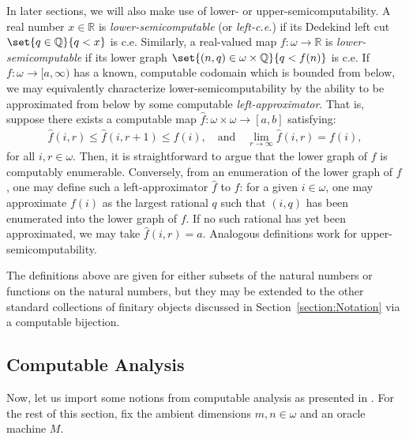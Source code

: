 In later sections, we will also make use of lower- or upper-semicomputability. A real number $x \in \mathbb{R}$ is \textit{lower-semicomputable} (or \textit{left-c.e.}) if its Dedekind left cut $\set{q \in \mathbb{Q}}{q < x}$ is c.e. Similarly, a real-valued map $f: \omega \to \mathbb{R}$ is \textit{lower-semicomputable} if its lower graph $\set{(n, q) \in \omega \times \mathbb{Q}}{q < f(n)}$ is c.e. If $f : \omega \to [a, \infty)$ has a known, computable codomain which is bounded from below, we may equivalently characterize lower-semicomputability by the ability to be approximated from below by some computable \textit{left-approximator}. That is, suppose there exists a computable map $\widehat{f} : \omega \times \omega \to [a, b]$ satisfying:
\begin{align*}
    \widehat{f}(i, r) \leq \widehat{f}(i, r + 1) \leq f(i), \quad \text{and} \quad \lim_{r \to \infty} \widehat{f}(i, r) = f(i),
\end{align*}
for all $i, r \in \omega$. Then, it is straightforward to argue that the lower graph of $f$ is computably enumerable. Conversely, from an enumeration of the lower graph of $f$, one may define such a left-approximator $\widehat{f}$ to $f$: for a given $i \in \omega$, one may approximate $f(i)$ as the largest rational $q$ such that $(i, q)$ has been enumerated into the lower graph of $f$. If no such rational has yet been approximated, we may take $\widehat{f}(i, r) = a$. Analogous definitions work for upper-semicomputability. 

The definitions above are given for either subsets of the natural numbers or functions on the natural numbers, but they may be extended to the other standard collections of finitary objects discussed in Section~\ref{section:Notation} via a computable bijection.

\subsection{Computable Analysis}

Now, let us import some notions from computable analysis as presented in \cite{KF82}. For the rest of this section, fix the ambient dimensions $m, n \in \omega$ and an oracle machine $M$. 

